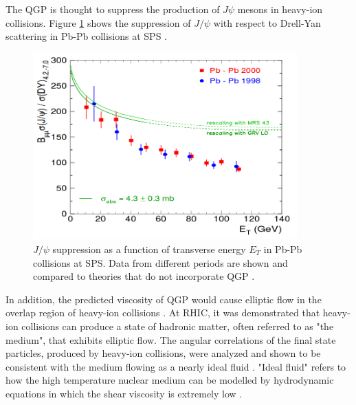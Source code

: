 The QGP is thought to suppress the production of $J\psi$ mesons in heavy-ion collisions. Figure \ref{fig:jpsiSupp} shows the suppression of $J/\psi$ with respect to Drell-Yan scattering in Pb-Pb collisions at SPS \cite{spsHI}.
\begin{figure}[h!]
\begin{centering}
\includegraphics[width=4in]{Chapter1/importfigs/jpsiSupp.png}
\par\end{centering}
\caption{$J/\psi$ suppression as a function of transverse energy $E_T$ in Pb-Pb collisions at SPS. Data from different periods are shown and compared to theories that do not incorporate QGP \cite{spsHI}. \label{fig:jpsiSupp}}
\end{figure}

In addition, the predicted viscosity of QGP would cause elliptic flow in the overlap region of heavy-ion collisions \cite{phobosFlow}. At RHIC, it was demonstrated that heavy-ion collisions can produce a state of hadronic matter, often referred to as "the medium", that exhibits elliptic flow. The angular correlations of the final state particles, produced by heavy-ion collisions, were analyzed and shown to be consistent with the medium flowing as a nearly ideal fluid \cite{Chatrchyan:2013nka}. "Ideal fluid" refers to how the high temperature nuclear medium can be modelled by hydrodynamic equations in which the shear viscosity is extremely low \cite{Karsch:2000kv}.

